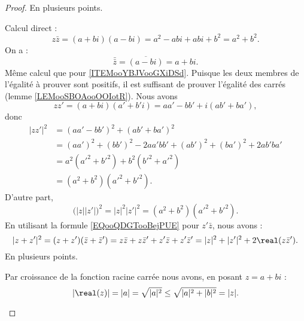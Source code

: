\begin{proof}
	En plusieurs points.
	\begin{subproof}
		Calcul direct :
		\begin{equation}
			z\bar z=(a+bi)(a-bi)=a^2-abi+abi+b^2=a^2+b^2.
		\end{equation}
		On a :
		\begin{equation}
			\bar{\bar z}=\overline{ (a-bi) }=a+bi.
		\end{equation}
		Même calcul que pour \ref{ITEMooYBJVooGXiDSd}.
		Puisque les deux membres de l'égalité à prouver sont positifs, il est suffisant de prouver l'égalité des carrés (lemme \ref{LEMooSBOAooOOIotR}). Nous avons
		\begin{equation}
			zz'=(a+bi)(a'+b'i)=aa'-bb'+i(ab'+ba'),
		\end{equation}
		donc
		\begin{subequations}
			\begin{align}
				| zz' |^2 & =(aa'-bb')^2+(ab'+ba')^2                         \\
				          & =(aa')^2+(bb')^2-2aa'bb'+(ab')^2+(ba')^2+2ab'ba' \\
				          & =a^2(a'^2+b'^2)+b^2(b'^2+a'^2)                   \\
				          & =(a^2+b^2)(a'^2+b'^2).
			\end{align}
		\end{subequations}
		D'autre part,
		\begin{equation}        \label{EQooRSGGooGfWTrS}
			\big( | z | |z' | \big)^2=| z |^2| z' |^2=(a^2+b^2)(a'^2+b'^2).
		\end{equation}
		En utilisant la formule \eqref{EQooQDGTooBejPUE} pour \( z'\bar z\), nous avons :
		\begin{equation}
			| z+z' |^2=(z+z')(\bar z+\bar z')=z\bar z+z\bar z'+z'\bar z+z'\bar z'=| z |^2+| z' |^2+2\real(z\bar z').
		\end{equation}
		En plusieurs points.
		\begin{subproof}
			\spitem[L'inégalité]
			Par croissance de la fonction racine carrée nous avons, en posant \( z=a+bi\) :
			\begin{equation}        \label{EQooBFANooKcSsWi}
				| \real(z) |=| a |=\sqrt{ | a |^2 }\leq \sqrt{ | a |^2+| b |^2 }=| z |.
			\end{equation}

\end{subproof}
\end{subproof}
\end{proof}
